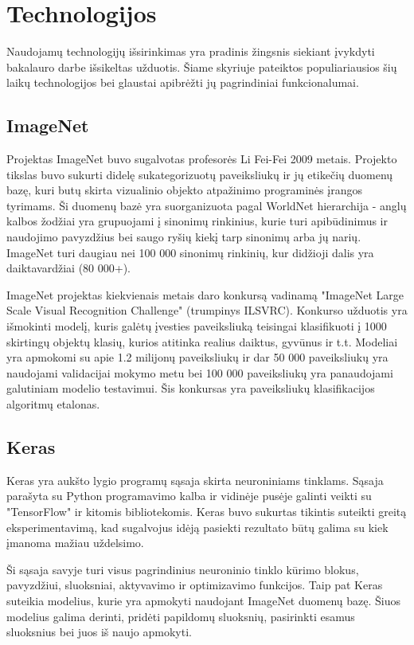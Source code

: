 \documentclass{VUMIFPSbakalaurinis}
\begin{document}
\section{Technologijos}
Naudojamų technologijų išsirinkimas yra pradinis žingsnis siekiant įvykdyti bakalauro darbe išsikeltas užduotis. Šiame skyriuje pateiktos populiariausios šių laikų technologijos 
bei glaustai apibrėžti jų pagrindiniai funkcionalumai.

\subsection{ImageNet}
Projektas ImageNet buvo sugalvotas profesorės Li Fei-Fei 2009 metais. Projekto tikslas buvo sukurti didelę sukategorizuotų paveiksliukų ir jų etikečių duomenų bazę, 
kuri butų skirta vizualinio objekto atpažinimo programinės įrangos tyrimams. Ši duomenų bazė yra suorganizuota pagal WorldNet hierarchija - anglų kalbos žodžiai 
yra grupuojami į sinonimų rinkinius, kurie turi apibūdinimus ir naudojimo pavyzdžius bei saugo ryšių kiekį tarp sinonimų arba jų narių. ImageNet turi daugiau nei 
100 000 sinonimų rinkinių, kur didžioji dalis yra daiktavardžiai (80 000+). 

ImageNet projektas kiekvienais metais daro konkursą vadinamą "ImageNet Large Scale Visual Recognition Challenge" (trumpinys ILSVRC). Konkurso užduotis yra 
išmokinti modelį, kuris galėtų įvesties paveiksliuką teisingai klasifikuoti į 1000 skirtingų objektų klasių, kurios atitinka realius daiktus, gyvūnus ir t.t. Modeliai 
yra apmokomi su apie 1.2 milijonų paveiksliukų ir dar 50 000 paveiksliukų yra naudojami validacijai mokymo metu bei 100 000 paveiksliukų yra panaudojami galutiniam 
modelio testavimui. Šis konkursas yra paveiksliukų klasifikacijos algoritmų etalonas.

\subsection{Keras}
Keras yra aukšto lygio programų sąsaja skirta neuroniniams tinklams. Sąsaja parašyta su Python programavimo kalba ir vidinėje pusėje galinti veikti su "TensorFlow" 
ir kitomis bibliotekomis. Keras buvo sukurtas tikintis suteikti greitą eksperimentavimą, kad sugalvojus idėją pasiekti rezultato būtų galima su kiek įmanoma mažiau uždelsimo.

Ši sąsaja savyje turi visus pagrindinius neuroninio tinklo kūrimo blokus, pavyzdžiui, sluoksniai, aktyvavimo ir optimizavimo funkcijos. Taip pat Keras suteikia modelius, 
kurie yra apmokyti naudojant ImageNet duomenų bazę. Šiuos modelius galima derinti, pridėti papildomų sluoksnių, pasirinkti esamus sluoksnius bei juos iš naujo apmokyti.
\end{document}
